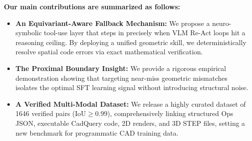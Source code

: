 \noindent\textbf{Our main contributions are summarized as follows:}
\begin{itemize}
  \item \textbf{An Equivariant-Aware Fallback Mechanism:} We propose a neuro-symbolic
        tool-use layer that steps in precisely when VLM Re-Act loops hit a reasoning
        ceiling.
        By deploying a unified geometric skill, we deterministically resolve spatial code
        errors via exact mathematical verification.
  \item \textbf{The Proximal Boundary Insight:} We provide a
        rigorous empirical demonstration showing that targeting near-miss geometric
        mismatches isolates the optimal SFT learning signal without introducing structural
        noise.
  \item \textbf{A Verified Multi-Modal Dataset:} We release a highly curated dataset of
        1646 verified pairs ($\text{IoU} \ge 0.99$), comprehensively linking structured
        Ops JSON, executable CadQuery code, 2D renders, and 3D STEP files, setting a new
        benchmark for programmatic CAD training data.
\end{itemize}
